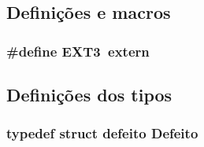 \subsection{Definições e macros}
\hypertarget{_p-_defeitos_8h_ac39da83b60c64c028dc886f0e97f1d8d}{
\subsubsection[{E\-X\-T3}]{\setlength{\rightskip}{0pt plus 5cm}\#define E\-X\-T3~extern}}\label{_p-_defeitos_8h_ac39da83b60c64c028dc886f0e97f1d8d}


\subsection{Definições dos tipos}
\hypertarget{_p-_defeitos_8h_adedc13f79ae20c7142e1ec096aab90fe}{
\subsubsection[{Defeito}]{\setlength{\rightskip}{0pt plus 5cm}typedef struct {\bf defeito} {\bf Defeito}}}\label{_p-_defeitos_8h_adedc13f79ae20c7142e1ec096aab90fe}


